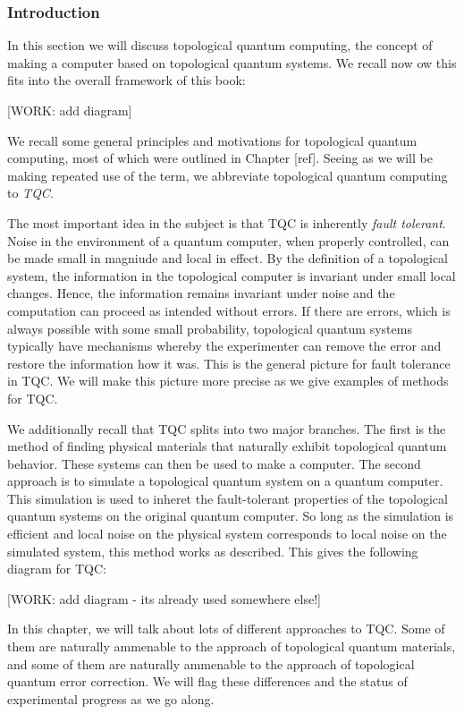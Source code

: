 \documentclass{article}
\theoremstyle{definition}
\numberwithin{figure}{section}
\begin{document}
\subsubsection{Introduction}

In this section we will discuss topological quantum computing, the concept of making a computer based on topological quantum systems. We recall now ow this fits into the overall framework of this book:

[WORK: add diagram]

We recall some general principles and motivations for topological quantum computing, most of which were outlined in Chapter [ref]. Seeing as we will be making repeated use of the term, we abbreviate topological quantum computing to \textit{TQC}.

The most important idea in the subject is that TQC is inherently \textit{fault tolerant}. Noise in the environment of a quantum computer, when properly controlled, can be made small in magniude and local in effect. By the definition of a topological system, the information in the topological computer is invariant under small local changes. Hence, the information remains invariant under noise and the computation can proceed as intended without errors. If there are errors, which is always possible with some small probability, topological quantum systems typically have mechanisms whereby the experimenter can remove the error and restore the information how it was. This is the general picture for fault tolerance in TQC. We will make this picture more precise as we give examples of methods for TQC.

We additionally recall that TQC splits into two major branches. The first is the method of finding physical materials that naturally exhibit topological quantum behavior. These systems can then be used to make a computer. The second approach is to simulate a topological quantum system on a quantum computer. This simulation is used to inheret the fault-tolerant properties of the topological quantum systems on the original quantum computer. So long as the simulation is efficient and local noise on the physical system corresponds to local noise on the simulated system, this method works as described. This gives the following diagram for TQC:

[WORK: add diagram - its already used somewhere else!]

In this chapter, we will talk about lots of different approaches to TQC. Some of them are naturally ammenable to the approach of topological quantum materials, and some of them are naturally ammenable to the approach of topological quantum error correction. We will flag these differences and the status of experimental progress as we go along.
\end{document}

